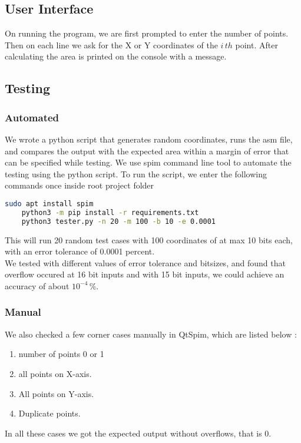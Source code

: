 \documentclass{article}
\begin{document}
\subsection{User Interface}
On running the program, we are first prompted to enter the number of points.
Then on each line we ask for the X or Y coordinates of the \(i\,th\) point.
After calculating the area is printed on the console with a message.

\subsection{Testing}
\subsubsection{Automated}
We wrote a python script that generates random coordinates, runs the asm file, and compares the
output with the expected area within a margin of error that can be specified while testing. We use spim command line
tool to automate the testing using the python script. To run the script, we enter the following commands once inside root project folder 
\begin{lstlisting}[language=bash]
    sudo apt install spim
    python3 -m pip install -r requirements.txt
    python3 tester.py -n 20 -m 100 -b 10 -e 0.0001 
\end{lstlisting}
This will run 20 random test cases with 100 coordinates of at max 10 bits each,
with an error tolerance of  0.0001 percent. \\
We tested with different values of error tolerance and bitsizes, and found that overflow occured at 16 bit inputs
and with 15 bit inputs, we could achieve an accuracy of about \(10^{-4}\,\%\). 

\subsubsection{Manual}
We also checked a few corner cases manually in QtSpim, which are listed below : 
\begin{enumerate}
    \item number of points 0 or 1
    \item all points on X-axis.
    \item All points on Y-axis.
    \item Duplicate points.
\end{enumerate}
In all these cases we got the expected output without overflows, that is 0.
\end{document}
